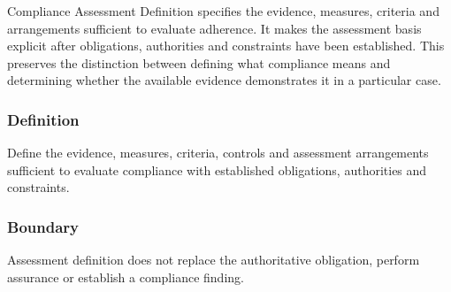 Compliance Assessment Definition specifies the evidence, measures, criteria and arrangements sufficient to evaluate adherence. It makes the assessment basis explicit after obligations, authorities and constraints have been established. This preserves the distinction between defining what compliance means and determining whether the available evidence demonstrates it in a particular case.

\subsubsection*{Definition}

Define the evidence, measures, criteria, controls and assessment arrangements sufficient to evaluate compliance with established obligations, authorities and constraints.

\subsubsection*{Boundary}

Assessment definition does not replace the authoritative obligation, perform assurance or establish a compliance finding.

